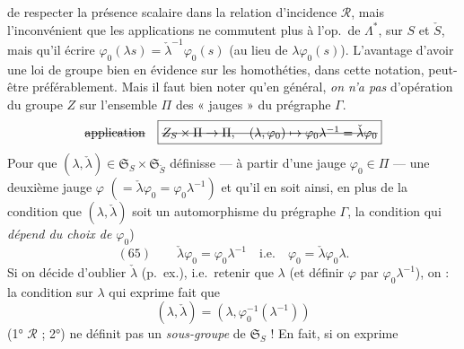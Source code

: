 \documentclass[11pt,a4paper]{article}
\begin{document}
de respecter la présence scalaire dans la relation d'incidence $\mathcal{R}$,
mais l'inconvénient que les applications ne commutent plus à l'op.\ de
$\Lambda^{*}$, sur $S$ et $\check{S}$, mais qu'il  écrire
$\varphi_0(\lambda s) = \check{\lambda}^{-1} \varphi_0(s)$
(au lieu de $\lambda \varphi_0(s)$). L'avantage d'avoir une loi de groupe
bien en évidence sur les homothéties, dans cette notation, 
peut-être préférablement. Mais il faut bien noter qu'en général, \emph{on n'a
pas} d'opération du groupe $Z$ sur l'ensemble $\Pi$ des « jauges » du
prégraphe $\Gamma$. 
\[
\text{\struck{application}}\quad
\boxed{\text{\struck{$Z_S \times \Pi \to \Pi,\quad (\lambda, \varphi_0) \mapsto \varphi_0 \lambda^{-1} = \check{\lambda} \varphi_0$}}}
\]
Pour que $(\lambda, \check{\lambda}) \in \mathfrak{S}_S \times \mathfrak{S}_{\check{S}}$
définisse — à partir d'une jauge $\varphi_0 \in \Pi$ — une deuxième jauge
$\varphi$ $(= \check{\lambda} \varphi_0 = \varphi_0 \lambda^{-1})$ et qu'il en
soit ainsi, en plus de la condition que $(\lambda, \check{\lambda})$ soit un
automorphisme du prégraphe $\Gamma$, la condition qui \emph{dépend du choix
de $\varphi_0$})
\[
(65)\qquad \check{\lambda} \varphi_0 = \varphi_0 \lambda^{-1} \quad \text{i.e.} \quad \varphi_0 = \check{\lambda} \varphi_0 \lambda .
\]
Si on décide d'oublier $\check{\lambda}$ (p.\ ex.), i.e.\ retenir que
$\lambda$ (et définir $\varphi$ par $\varphi_0 \lambda^{-1}$), on
 : la \struck{\ill{}}  condition sur
$\lambda$ qui exprime  fait que
\[
(\lambda, \check{\lambda}) = (\lambda, \varphi_0^{-1}(\lambda^{-1}))
\]
 (1° 
$\mathcal{R}$ ; 2°) ne définit pas  un \emph{sous-groupe}
de $\mathfrak{S}_S$ ! En fait, si on exprime
\end{document}
